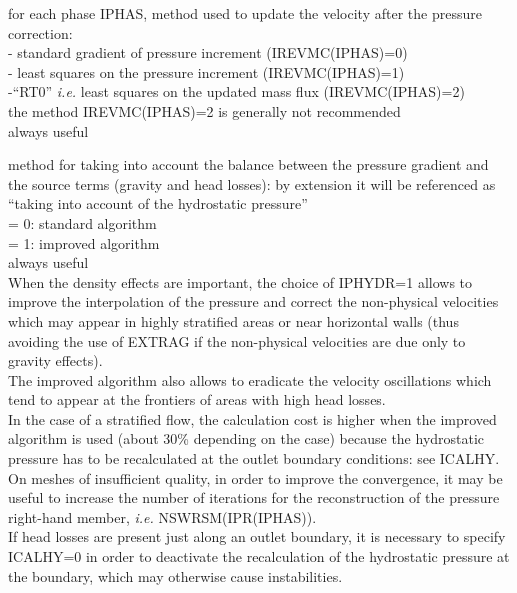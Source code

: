 {for each phase IPHAS, method used to update the velocity after the pressure
correction:\\ 
\hspace*{0,5cm}- standard gradient of pressure increment
(IREVMC(IPHAS)=0)\\
\hspace*{0,5cm}- least squares on the pressure increment
(IREVMC(IPHAS)=1)\\
\hspace*{0,5cm}-``RT0'' {\em i.e.} least squares on the updated mass flux
(IREVMC(IPHAS)=2)\\
the method IREVMC(IPHAS)=2 is generally not recommended\\
always useful}

{method for taking into account the balance between the pressure gradient and
the source terms (gravity and head losses): by extension it will be
referenced as ``taking into account of the hydrostatic pressure''\\
\hspace*{1.3cm}= 0: standard algorithm\\
\hspace*{1.3cm}= 1: improved algorithm\\
always useful\\
When the density effects are important, the choice of
IPHYDR=1 allows to improve the interpolation of the pressure and correct the
non-physical velocities which may appear in highly
stratified areas or near horizontal walls (thus
avoiding the use of EXTRAG if the non-physical velocities are due only to
gravity effects).\\ 
The improved algorithm also allows to eradicate the velocity oscillations
which tend to appear at the frontiers of areas with high head losses.\\
In the case of a stratified flow, the calculation cost is higher when the
improved algorithm is used (about 30\% depending on the case) because
the hydrostatic pressure has to be recalculated at the outlet boundary
conditions: see ICALHY.\\
On meshes of insufficient quality, in order to
improve the convergence, it may be useful to increase the number of
iterations for the reconstruction of the pressure right-hand member,
{\em i.e.} \mbox{NSWRSM(IPR(IPHAS))}.\\
If head losses are present just along an outlet boundary, it is necessary to
specify ICALHY=0 in order to deactivate the recalculation of the hydrostatic
pressure at the boundary, which may otherwise cause instabilities.}

